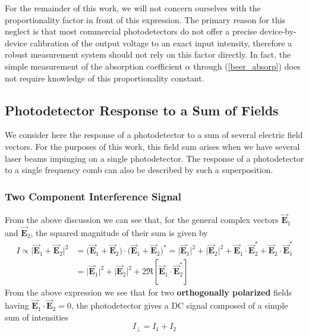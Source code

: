 For the remainder of this work, we will not concern ourselves with the proportionality factor in front of this expression. The primary reason for this neglect is that most commercial photodetectors do not offer a precise device-by-device calibration of the output voltage to an exact input intensity, therefore a robust measurement system should not rely on this factor directly. In fact, the simple measurement of the absorption coefficient $\alpha$ through (\ref{beer_absorp}) does not require knowledge of this proportionality constant.

\subsection{Photodetector Response to a Sum of Fields}
We consider here the response of a photodetector to a sum of several electric field vectors. For the purposes of this work, this field sum arises when we have several laser beams impinging on a single photodetector. The response of a photodetector to a single frequency comb can also be described by such a superposition.

\subsubsection{Two Component Interference Signal}
From the above discussion we can see that, for the general complex vectors $\vec{\mathbf{E}}_1$ and $\vec{\mathbf{E}}_2$, the squared magnitude of their sum is given by
\begin{align} \label{beatnote_interference_two}
	I \propto \Big| \vec{\mathbf{E}}_1 + \vec{\mathbf{E}}_2 \Big|^2 &= \Big(\vec{\mathbf{E}}_1 + \vec{\mathbf{E}}_2\Big) \cdot \Big(\vec{\mathbf{E}}_1 + \vec{\mathbf{E}}_2\Big)^*
	= \big| \vec{\mathbf{E}}_1 \big|^2 + \big| \vec{\mathbf{E}}_2 \big|^2 + \vec{\mathbf{E}}_1\cdot \vec{\mathbf{E}}_2^* + \vec{\mathbf{E}}_2 \cdot \vec{\mathbf{E}}_1^*
	\nonumber \\
	&= \big| \vec{\mathbf{E}}_1 \big|^2 + \big| \vec{\mathbf{E}}_2 \big|^2 + 2 \Re \left[ \vec{\mathbf{E}}_1 \cdot \vec{\mathbf{E}}^*_2 \right]
\end{align}
From the above expression we see that for two \textbf{orthogonally polarized} fields having $\vec{\mathbf{E}}_1 \cdot \vec{\mathbf{E}}_2 = 0$, the photodetector gives a DC signal composed of a simple sum of intensities
\begin{equation}
	I_{\perp} = I_1 + I_2
\end{equation}


